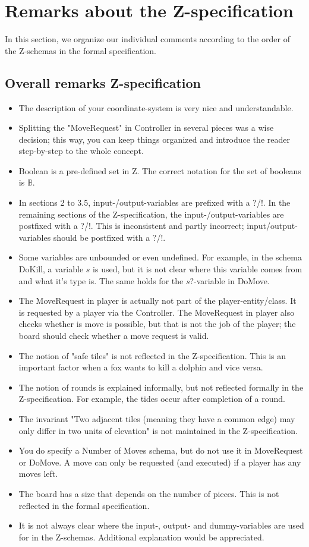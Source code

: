 \documentclass[a4paper,11pt]{article}
\begin{document}
	\section{Remarks about the Z-specification}
    In this section, we organize our individual comments according to the order of the Z-schemas in the formal specification.
    \subsection{Overall remarks Z-specification}
    \begin{itemize}
        \item The description of your coordinate-system is very nice and understandable.
        \item Splitting the "MoveRequest" in Controller in several pieces was a wise decision; this way, you can keep things organized and introduce the reader step-by-step to the whole concept.
        \item Boolean is a pre-defined set in Z. The correct notation for the set of booleans is $\mathds{B}$.
        \item In sections 2 to  3.5, input-/output-variables are prefixed with a ?/!. In the remaining sections of the Z-specification, the input-/output-variables are postfixed with a ?/!. This is inconsistent and partly incorrect; input/output-variables should be postfixed with a ?/!.
        \item Some variables are unbounded or even undefined. For example, in the schema DoKill, a variable $s$ is used, but it is not clear where this variable comes from and what it's type is. The same holds for the $s?$-variable in DoMove.
        \item The MoveRequest in player is actually not part of the player-entity/class. It is requested by a player via the Controller. The MoveRequest in player also checks whether is move is possible, but that is not the job of the player; the board should check whether a move request is valid.
        \item The notion of "safe tiles" is not reflected in the Z-specification. This is an important factor when a fox wants to kill a dolphin and vice versa.
        \item The notion of rounds is explained informally, but not reflected formally in the Z-specification. For example, the tides occur after completion of a round.
        \item The invariant "Two adjacent tiles (meaning they have a common edge) may only differ in two units of elevation" is not maintained in the Z-specification.
        \item You do specify a Number of Moves schema, but do not use it in MoveRequest or DoMove. A move can only be requested (and executed) if a player has any moves left.
        \item The board has a size that depends on the number of pieces. This is not reflected in the formal specification.
        \item It is not always clear where the input-, output- and dummy-variables are used for in the Z-schemas. Additional explanation would be appreciated.
    \end{itemize}
\end{document}
